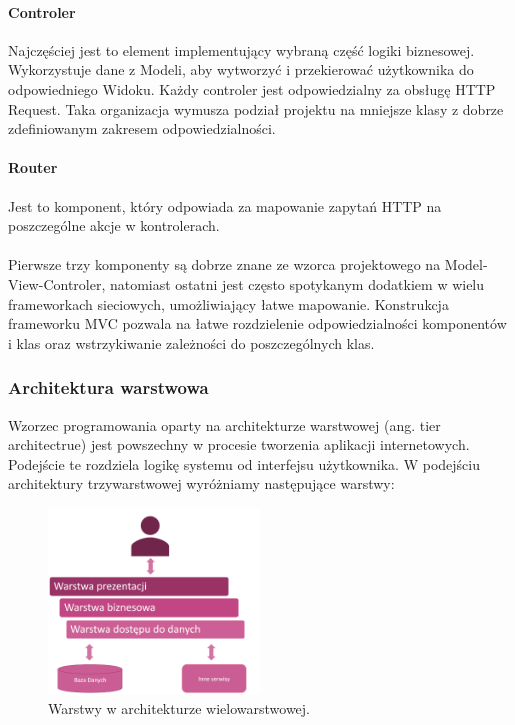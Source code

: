 \documentclass{article}
\begin{document}
\paragraph{Controler}
Najczęściej jest to element implementujący wybraną część logiki biznesowej. Wykorzystuje dane z Modeli, aby wytworzyć i przekierować użytkownika do odpowiedniego Widoku. Każdy controler jest odpowiedzialny za obsługę HTTP Request. Taka organizacja wymusza podział projektu na mniejsze klasy z dobrze zdefiniowanym zakresem odpowiedzialności.

\paragraph{Router}
Jest to komponent, który odpowiada za mapowanie zapytań HTTP na poszczególne akcje w kontrolerach.
\\\\
Pierwsze trzy komponenty są dobrze znane ze wzorca projektowego na Model-View-Controler, natomiast ostatni jest często spotykanym dodatkiem w wielu frameworkach sieciowych, umożliwiający łatwe mapowanie. Konstrukcja frameworku MVC pozwala na łatwe rozdzielenie odpowiedzialności komponentów i klas oraz wstrzykiwanie zależności do poszczególnych klas.

\subsubsection{Architektura warstwowa}

Wzorzec programowania oparty na architekturze warstwowej (ang. tier architectrue) jest powszechny w procesie tworzenia aplikacji internetowych. Podejście te rozdziela logikę systemu od interfejsu użytkownika. W podejściu architektury trzywarstwowej wyróżniamy następujące warstwy:

\begin{figure}[h]
\centering
	\includegraphics[width=0.50\textwidth]{ntier.png}
	\caption[caption]{Warstwy w architekturze wielowarstwowej.}
	\label{fig:tier}
\end{figure}
\end{document}
